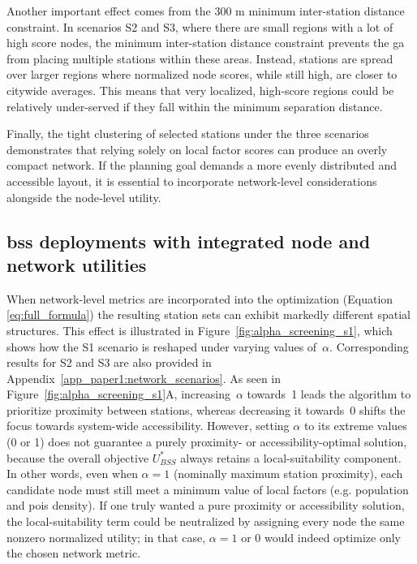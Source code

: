     Another important effect comes from the 300 m minimum inter-station distance constraint. In scenarios S2 and S3, where there are small regions with a lot of high score nodes, the minimum inter-station distance constraint prevents the \ac{ga} from placing multiple stations within these areas. Instead, stations are spread over larger regions where normalized node scores, while still high, are closer to citywide averages. This means that very localized, high‐score regions could be relatively under-served if they fall within the minimum separation distance. 

    Finally, the tight clustering of selected stations under the three scenarios demonstrates that relying solely on local factor scores can produce an overly compact network. If the planning goal demands a more evenly distributed and accessible layout, it is essential to incorporate network‐level considerations alongside the node‐level utility. 

    \subsection[BSS deployments with integrated node and network utilities]{\ac{bss} deployments with integrated node and network utilities}

    When network-level metrics are incorporated into the optimization  (Equation \ref{eq:full_formula}) the resulting station sets can exhibit markedly different spatial structures. This effect is illustrated in Figure~\ref{fig:alpha_screening_s1}, which shows how the S1 scenario is reshaped under varying values of~$\alpha$. Corresponding results for S2 and S3 are also provided in Appendix~\ref{app_paper1:network_scenarios}. As seen in Figure~\ref{fig:alpha_screening_s1}A, increasing~$\alpha$ towards~1 leads the algorithm to prioritize proximity between stations, whereas decreasing it towards~0 shifts the focus towards system-wide accessibility. However, setting $\alpha$ to its extreme values (0 or 1) does not guarantee a purely proximity- or accessibility-optimal solution, because the overall objective $U_{BSS}^{*}$ always retains a local-suitability component. In other words, even when $\alpha= 1$ (nominally maximum station proximity), each candidate node must still meet a minimum value of local factors (e.g. population and \acp{poi} density). If one truly wanted a pure proximity or accessibility solution, the local-suitability term could be neutralized by assigning every node the same nonzero normalized utility; in that case, $\alpha=1$ or $0$ would indeed optimize only the chosen network metric.

